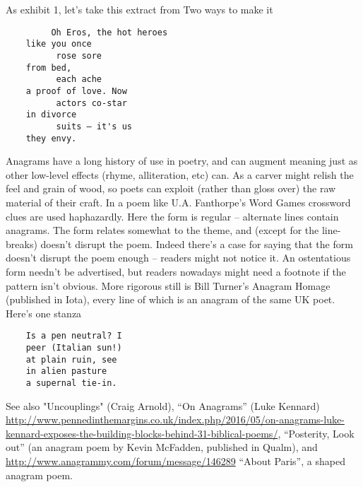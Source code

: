 \documentclass[11pt]{article}
\begin{document}
As exhibit 1, let's take this extract from Two ways to make it
\begin{verbatim}
         Oh Eros, the hot heroes
    like you once
          rose sore
    from bed,
          each ache
    a proof of love. Now
          actors co-star
    in divorce
          suits – it's us
    they envy.
\end{verbatim}
Anagrams have a long history of use in poetry, and can augment meaning just as other low-level effects (rhyme, alliteration, etc) can. As a carver might relish the feel and grain of wood, so poets can exploit (rather than gloss over) the raw material of their craft. In a poem like U.A. Fanthorpe's Word Games crossword clues are used haphazardly. Here the form is regular – alternate lines contain anagrams. The form relates somewhat to the theme, and (except for the line-breaks) doesn't disrupt the poem. Indeed there's a case for saying that the form doesn't disrupt the poem enough – readers might not notice it. An ostentatious form needn't be advertised, but readers nowadays might need a footnote if the pattern isn't obvious. More rigorous still is Bill Turner’s Anagram Homage (published in Iota), every line of which is an anagram of the same UK poet. Here’s one stanza
\begin{verbatim}
    Is a pen neutral? I
    peer (Italian sun!)
    at plain ruin, see
    in alien pasture
    a supernal tie-in.
\end{verbatim}
See also "Uncouplings" (Craig Arnold), ``On Anagrams'' (Luke Kennard) \url{http://www.pennedinthemargins.co.uk/index.php/2016/05/on-anagrams-luke-kennard-exposes-the-building-blocks-behind-31-biblical-poems/}, ``Posterity, Look out'' (an anagram poem by Kevin McFadden, published in Qualm), and \url{http://www.anagrammy.com/forum/message/146289} ``About Paris'', a shaped anagram poem.
\end{document}
